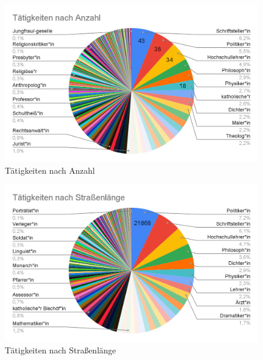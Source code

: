 \documentclass[ngerman,twocolumn,showpacs,%
  nofootinbib,aps,superscriptaddress,%
  eqsecnum,prd,notitlepage,showkeys,10pt,report]{revtex4-2}
\begin{document}
\begin{figure}
\centering
\includegraphics[width=1\linewidth,frame]{5.png}
\caption{Tätigkeiten nach Anzahl}
\label{fig:JobsByCount}
\end{figure}
\begin{figure}
\centering
\includegraphics[width=1\linewidth,frame]{6.png}
\caption{Tätigkeiten nach Straßenlänge}
\label{fig:JobsByLength}
\end{figure}
\end{document}
